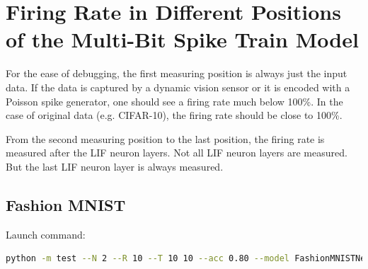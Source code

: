 \chapter{Firing Rate in Different Positions of the Multi-Bit Spike Train Model}
\label{appendix:firerate}

    For the ease of debugging, the first measuring position is always just the input data. If the data is captured by a dynamic vision sensor or it is encoded with a Poisson spike generator, one should see a firing rate much below 100\%. In the case of original data (e.g. CIFAR-10), the firing rate should be close to 100\%. 

    From the second measuring position to the last position, the firing rate is measured after the LIF neuron layers. Not all LIF neuron layers are measured. But the last LIF neuron layer is always measured. 

    \section{Fashion MNIST}
    \label{appendix:firerate_fashion_mnist}
        Launch command: 
        \begin{lstlisting}[language=Bash, basicstyle=\small, breaklines=true]
python -m test --N 2 --R 10 --T 10 10 --acc 0.80 --model FashionMNISTNet --data-path /scratch/zyi/codeSpace/data --dataset FashionMNIST --batch-size 128 --opt adam --lr 2e-3 --lr-scheduler none --epochs 50 --lr-warmup-epochs 0 --output-dir /scratch/zyi/codeSpace/MultibitSpikes/firerate --mixup-alpha 0.0 --cutmix-alpha 0.0 --label-smoothing 0.0 --disable-amp
        \end{lstlisting}

